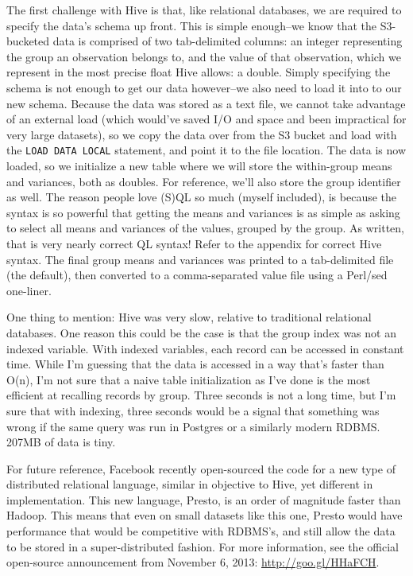 \documentclass[12pt]{article}
\begin{document}
The first challenge with Hive is that, like relational databases, we are required to specify the data's schema up front. This is simple enough--we know that the S3-bucketed data is comprised of two tab-delimited columns: an integer representing the group an observation belongs to, and the value of that observation, which we represent in the most precise float Hive allows: a double. Simply specifying the schema is not enough to get our data however--we also need to load it into to our new schema. Because the data was stored as a text file, we cannot take advantage of an external load (which would've saved I/O and space and been impractical for very large datasets), so we copy the data over from the S3 bucket and load with the \verb+LOAD DATA LOCAL+ statement, and point it to the file location. The data is now loaded, so we initialize a new table where we will store the within-group means and variances, both as doubles. For reference, we'll also store the group identifier as well. The reason people love (S)QL so much (myself included), is because the syntax is so powerful that getting the means and variances is as simple as asking to select all means and variances of the values, grouped by the group. As written, that is very nearly correct QL syntax! Refer to the appendix for correct Hive syntax. The final group means and variances was printed to a tab-delimited file (the default), then converted to a comma-separated value file using a Perl/sed one-liner. 

One thing to mention: Hive was very slow, relative to traditional relational databases. One reason this could be the case is that the group index was not an indexed variable. With indexed variables, each record can be accessed in constant time. While I'm guessing that the data is accessed in a way that's faster than O(n), I'm not sure that a naive table initialization as I've done is the most efficient at recalling records by group. Three seconds is not a long time, but I'm sure that with indexing, three seconds would be a signal that something was wrong if the same query was run in Postgres or a similarly modern RDBMS. 207MB of data is tiny.

For future reference, Facebook recently open-sourced the code for a new type of distributed relational language, similar in objective to Hive, yet different in implementation. This new language, Presto, is an order of magnitude faster than Hadoop. This means that even on small datasets like this one, Presto would have performance that would be competitive with RDBMS's, and still allow the data to be stored in a super-distributed fashion. For more information, see the official open-source announcement from November 6, 2013: \url{http://goo.gl/HHaFCH}.
\end{document}
